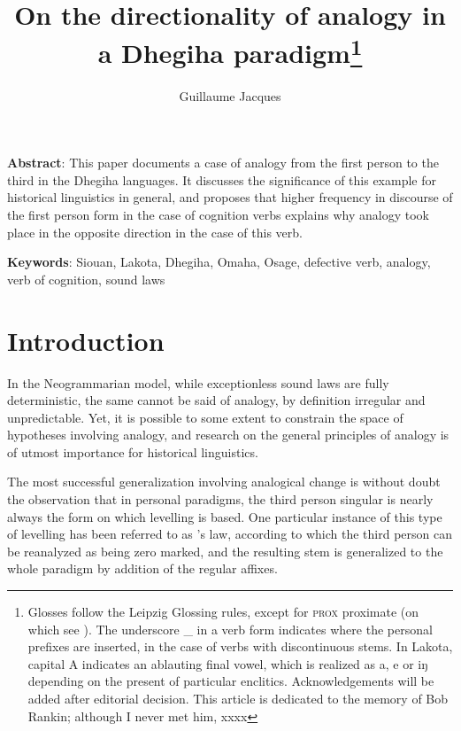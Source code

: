 \documentclass[oneside,a4paper,11pt]{article}
\newcommand{\ipa}[1]{{\phon#1}} %
\begin{document}
 

\title{On the directionality of analogy in a Dhegiha paradigm\footnote{Glosses follow the Leipzig Glossing rules, except for \textsc{prox} proximate (on which see \citealt{eschenberg05omaha}). The underscore \_ in a verb form indicates where the personal prefixes are inserted, in the case of verbs with discontinuous stems. In Lakota, capital \ipa{A} indicates an ablauting final vowel, which is realized as \ipa{a}, \ipa{e} or \ipa{iŋ} depending on the present of particular enclitics. Acknowledgements will be added after editorial decision. This article is dedicated to the memory of Bob Rankin; although I never met him, xxxx}}
\author{Guillaume Jacques}
\maketitle
\textbf{Abstract}: This paper documents a case of analogy from the first person to the third in the Dhegiha languages. It discusses the significance of this example for historical linguistics in general, and proposes that higher frequency in discourse of the first person form in the case of cognition verbs explains why analogy took place in the opposite direction in the case of this verb.

\textbf{Keywords}: Siouan, Lakota, Dhegiha, Omaha, Osage, defective verb, analogy, verb of cognition, sound laws
 
\section{Introduction}

In the Neogrammarian model, while exceptionless sound laws are fully deterministic, the same cannot be said of analogy, by definition irregular and unpredictable. Yet, it is possible to some extent to constrain  the space of hypotheses involving analogy, and research on the general principles of analogy is of utmost importance for historical linguistics.

The most successful generalization involving analogical change is without doubt the observation that in personal paradigms, the third person singular is nearly always the form on which levelling is based. One particular instance of this type of levelling has been referred to as  \citet{watkins62celtic}'s law, according to which the third person can be reanalyzed as being zero marked, and the resulting stem is generalized to the whole paradigm by addition of the regular affixes. 
\end{document}
